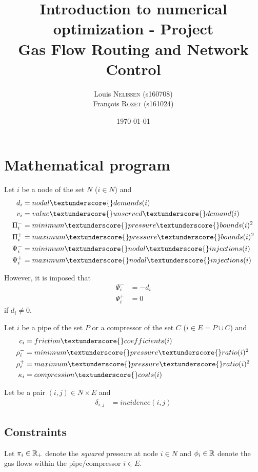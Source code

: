 \documentclass[a4paper, 12pt]{article}
\title{\vspace{-2cm}Introduction to numerical optimization - Project \\[0.25em]Gas Flow Routing and Network Control}
\author{
Louis \textsc{Nelissen} (s160708)\\
François \textsc{Rozet} (s161024)\\
}
\date{\today}
\def\under{\textunderscore}
\begin{document}
\maketitle

\section{Mathematical program}

Let $i$ be a node of the set $N$ ($i \in N$) and
\begin{align*}
    d_i & = nodal\under{}demands(i) \\
    v_i & = value\under{}unserved\under{}demand(i) \\
    \Pi^-_i & = minimum\under{}pressure\under{}bounds(i)^2\\
    \Pi^+_i & = maximum\under{}pressure\under{}bounds(i)^2\\
    \Psi^-_i & = minimum\under{}nodal\under{}injections(i) \\
    \Psi^+_i & = maximum\under{}nodal\under{}injections(i)
\end{align*}

However, it is imposed that
\begin{align*}
    \Psi_i^- & = -d_i \\
    \Psi_i^+ & = 0
\end{align*}
if $d_i \neq 0$.

Let $i$ be a pipe of the set $P$ or a compressor of the set $C$ ($i \in E = P \cup C$) and
\begin{align*}
    c_i & = friction\under{}coefficients(i) \\
    \rho^-_i & = minimum\under{}pressure\under{}ratio(i)^2 \\
    \rho^+_i & = maximum\under{}pressure\under{}ratio(i)^2 \\
    \kappa_i & = compression\under{}costs(i)
\end{align*}

Let be a pair $(i, j) \in N \times E$ and
\begin{align*}
    \delta_{i,j} & = incidence(i, j)
\end{align*}

\newpage

\subsection{Constraints}

Let $\pi_i \in \mathbb{R}_+$ denote the \emph{squared} pressure at node $i \in N$ and $\phi_{i} \in \mathbb{R}$ denote the gas flows within the pipe/compressor $i \in E$.
\end{document}
